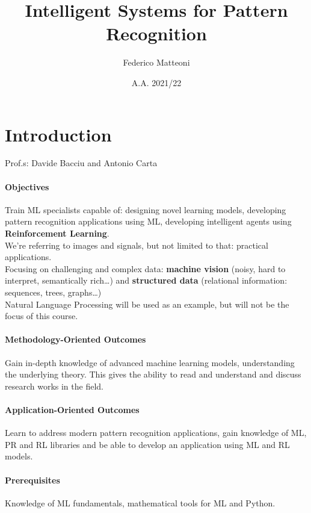 \documentclass[10pt]{report}
\begin{document}
\title{Intelligent Systems for Pattern Recognition}
\author{Federico Matteoni}
\date{A.A. 2021/22}
\renewcommand*\contentsname{Index}

\maketitle
\begin{multicols}{2}
\tableofcontents
\end{multicols}
\pagebreak
\section{Introduction}
Prof.s: Davide Bacciu and Antonio Carta
\paragraph{Objectives} Train ML specialists capable of: designing novel learning models, developing pattern recognition applications using ML, developing intelligent agents using \textbf{Reinforcement Learning}.\\
We're referring to images and signals, but not limited to that: practical applications.\\
Focusing on challenging and complex data: \textbf{machine vision} (noisy, hard to interpret, semantically rich\ldots) and \textbf{structured data} (relational information: sequences, trees, graphs\ldots)\\
Natural Language Processing will be used as an example, but will not be the focus of this course.
\paragraph{Methodology-Oriented Outcomes} Gain in-depth knowledge of advanced machine learning models, understanding the underlying theory. This gives the ability to read and understand and discuss research works in the field.
\paragraph{Application-Oriented Outcomes} Learn to address modern pattern recognition applications, gain knowledge of ML, PR and RL libraries and be able to develop an application using ML and RL models.
\paragraph{Prerequisites} Knowledge of ML fundamentals, mathematical tools for ML and Python.
\end{document}
